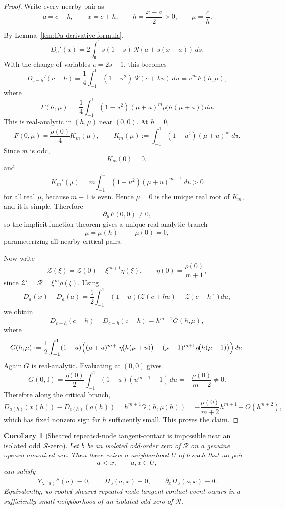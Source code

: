 \documentclass[11pt,a4paper]{amsart}
\theoremstyle{plain}
\newtheorem{corollary}[theorem]{Corollary}
\theoremstyle{definition}
\begin{document}
\begin{proof}
Write every nearby pair as
\[
a=c-h,\qquad x=c+h,\qquad h=\frac{x-a}{2}>0,\qquad \mu=\frac{c}{h}.
\]

By Lemma~\ref{lem:Da-derivative-formula},
\[
D_a'(x)
=
2\int_0^1 s(1-s)\,\mathcal R(a+s(x-a))\,ds.
\]
With the change of variables $u=2s-1$, this becomes
\[
D_{c-h}'(c+h)
=
\frac14\int_{-1}^1 (1-u^2)\,\mathcal R(c+hu)\,du
=
h^m F(h,\mu),
\]
where
\[
F(h,\mu)
:=
\frac14\int_{-1}^1 (1-u^2)(\mu+u)^m
\rho\!\bigl(h(\mu+u)\bigr)\,du.
\]
This is real-analytic in $(h,\mu)$ near $(0,0)$. At $h=0$,
\[
F(0,\mu)=\frac{\rho(0)}{4}K_m(\mu),
\qquad
K_m(\mu):=\int_{-1}^1 (1-u^2)(\mu+u)^m\,du.
\]
Since $m$ is odd,
\[
K_m(0)=0,
\]
and
\[
K_m'(\mu)
=
m\int_{-1}^1 (1-u^2)(\mu+u)^{m-1}\,du>0
\]
for all real $\mu$, because $m-1$ is even. Hence $\mu=0$ is the unique real
root of $K_m$, and it is simple. Therefore
\[
\partial_\mu F(0,0)\neq 0,
\]
so the implicit function theorem gives a unique real-analytic branch
\[
\mu=\mu(h),\qquad \mu(0)=0,
\]
parameterizing all nearby critical pairs.

Now write
\[
\mathcal Z(\xi)=\mathcal Z(0)+\xi^{m+1}\eta(\xi),
\qquad
\eta(0)=\frac{\rho(0)}{m+1},
\]
since $\mathcal Z'=\mathcal R=\xi^m\rho(\xi)$.
Using
\[
D_a(x)-D_a(a)
=
\frac12\int_{-1}^1 (1-u)\bigl(\mathcal Z(c+hu)-\mathcal Z(c-h)\bigr)\,du,
\]
we obtain
\[
D_{c-h}(c+h)-D_{c-h}(c-h)=h^{m+1}G(h,\mu),
\]
where
\[
G(h,\mu):=
\frac12\int_{-1}^1 (1-u)\Bigl(
(\mu+u)^{m+1}\eta\!\bigl(h(\mu+u)\bigr)
-(\mu-1)^{m+1}\eta\!\bigl(h(\mu-1)\bigr)
\Bigr)\,du.
\]
Again $G$ is real-analytic. Evaluating at $(0,0)$ gives
\[
G(0,0)
=
\frac{\eta(0)}{2}\int_{-1}^1 (1-u)(u^{m+1}-1)\,du
=
-\frac{\rho(0)}{m+2}\neq 0.
\]
Therefore along the critical branch,
\[
D_{a(h)}(x(h))-D_{a(h)}(a(h))
=
h^{m+1}G(h,\mu(h))
=
-\frac{\rho(0)}{m+2}h^{m+1}+O(h^{m+2}),
\]
which has fixed nonzero sign for $h$ sufficiently small. This proves the claim.
\end{proof}

\begin{corollary}[Sheared repeated-node tangent-contact is impossible near an isolated odd $\mathcal R$-zero]
\label{cor:sheared-event-impossible-near-isolated-odd-R-zero}
Let $b$ be an isolated odd-order zero of $\mathcal R$ on a genuine opened
nonmixed arc. Then there exists a neighborhood $U$ of $b$ such that no pair
\[
a<x,\qquad a,x\in U,
\]
can satisfy
\[
\widetilde Y_{\mathcal Z(a)}''(a)=0,
\qquad
\widetilde H_3(a,x)=0,
\qquad
\partial_x\widetilde H_3(a,x)=0.
\]
Equivalently, no rooted sheared repeated-node tangent-contact event occurs in
a sufficiently small neighborhood of an isolated odd zero of $\mathcal R$.
\end{corollary}
\end{document}
